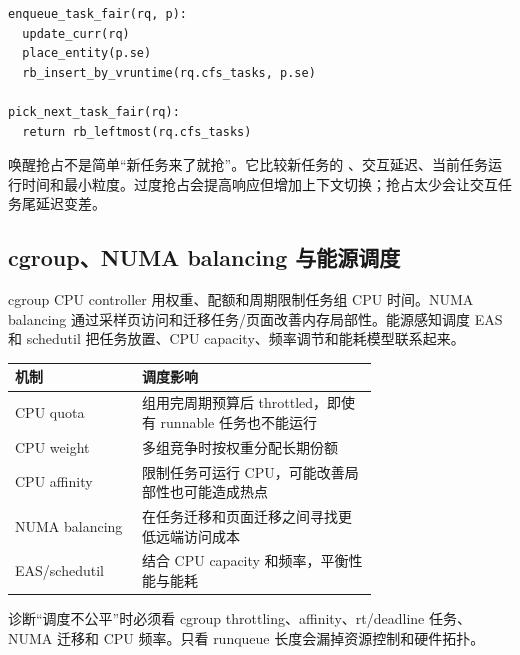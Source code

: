 \begin{lstlisting}
enqueue_task_fair(rq, p):
  update_curr(rq)
  place_entity(p.se)
  rb_insert_by_vruntime(rq.cfs_tasks, p.se)

pick_next_task_fair(rq):
  return rb_leftmost(rq.cfs_tasks)
\end{lstlisting}

唤醒抢占不是简单“新任务来了就抢”。它比较新任务的 、交互延迟、当前任务运行时间和最小粒度。过度抢占会提高响应但增加上下文切换；抢占太少会让交互任务尾延迟变差。

\subsection{cgroup、NUMA balancing 与能源调度}

cgroup CPU controller 用权重、配额和周期限制任务组 CPU 时间。NUMA balancing 通过采样页访问和迁移任务/页面改善内存局部性。能源感知调度 EAS 和 schedutil 把任务放置、CPU capacity、频率调节和能耗模型联系起来。

\begin{longtable}{|p{0.22\linewidth}|p{0.5\linewidth}|}
\toprule
机制 & 调度影响 \\
\midrule
CPU quota & 组用完周期预算后 throttled，即使有 runnable 任务也不能运行 \\\tablerowrule
CPU weight & 多组竞争时按权重分配长期份额 \\\tablerowrule
CPU affinity & 限制任务可运行 CPU，可能改善局部性也可能造成热点 \\\tablerowrule
NUMA balancing & 在任务迁移和页面迁移之间寻找更低远端访问成本 \\\tablerowrule
EAS/schedutil & 结合 CPU capacity 和频率，平衡性能与能耗 \\
\bottomrule
\end{longtable}

诊断“调度不公平”时必须看 cgroup throttling、affinity、rt/deadline 任务、NUMA 迁移和 CPU 频率。只看 runqueue 长度会漏掉资源控制和硬件拓扑。
